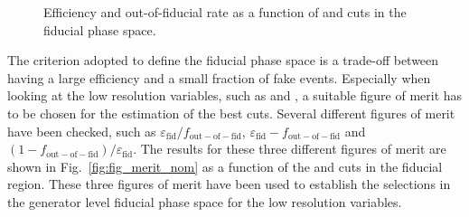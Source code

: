 \begin{figure}[htb]
\centering
{}
\caption{Efficiency and out-of-fiducial rate as a function of \MET and \mt cuts in the fiducial phase space.}\label{fig:eff_fake_nom}
\end{figure}

The criterion adopted to define the fiducial phase space is a trade-off between having a large efficiency and a small fraction of fake events. Especially when looking at the low resolution variables, such as \MET and \mt, a suitable figure of merit has to be chosen for the estimation of the best cuts. Several different figures of merit have been checked, such as $\varepsilon_\mathrm{fid}/f_\mathrm{out-of-fid}$, $\varepsilon_\mathrm{fid} - f_\mathrm{out-of-fid}$ and $(1-f_\mathrm{out-of-fid})/\varepsilon_\mathrm{fid}$. The results for these three different figures of merit are shown in Fig.~\ref{fig:fig_merit_nom} as a function of the \MET and \mt cuts in the fiducial region. These three figures of merit have been used to establish the selections in the generator level fiducial phase space for the low resolution variables.


